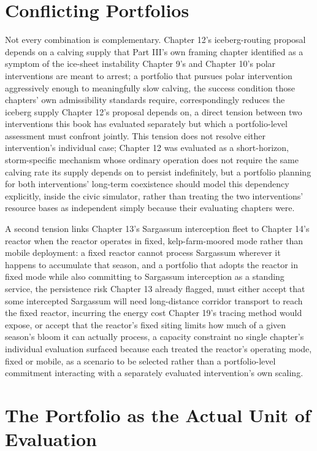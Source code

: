 \documentclass[11pt,oneside]{book}
\begin{document}
\section*{Conflicting Portfolios}

Not every combination is complementary. Chapter 12's iceberg-routing proposal depends on a calving supply that Part III's own framing chapter identified as a symptom of the ice-sheet instability Chapter 9's and Chapter 10's polar interventions are meant to arrest; a portfolio that pursues polar intervention aggressively enough to meaningfully slow calving, the success condition those chapters' own admissibility standards require, correspondingly reduces the iceberg supply Chapter 12's proposal depends on, a direct tension between two interventions this book has evaluated separately but which a portfolio-level assessment must confront jointly. This tension does not resolve either intervention's individual case; Chapter 12 was evaluated as a short-horizon, storm-specific mechanism whose ordinary operation does not require the same calving rate its supply depends on to persist indefinitely, but a portfolio planning for both interventions' long-term coexistence should model this dependency explicitly, inside the civic simulator, rather than treating the two interventions' resource bases as independent simply because their evaluating chapters were.

A second tension links Chapter 13's Sargassum interception fleet to Chapter 14's reactor when the reactor operates in fixed, kelp-farm-moored mode rather than mobile deployment: a fixed reactor cannot process Sargassum wherever it happens to accumulate that season, and a portfolio that adopts the reactor in fixed mode while also committing to Sargassum interception as a standing service, the persistence risk Chapter 13 already flagged, must either accept that some intercepted Sargassum will need long-distance corridor transport to reach the fixed reactor, incurring the energy cost Chapter 19's tracing method would expose, or accept that the reactor's fixed siting limits how much of a given season's bloom it can actually process, a capacity constraint no single chapter's individual evaluation surfaced because each treated the reactor's operating mode, fixed or mobile, as a scenario to be selected rather than a portfolio-level commitment interacting with a separately evaluated intervention's own scaling.

\section*{The Portfolio as the Actual Unit of Evaluation}
\end{document}
